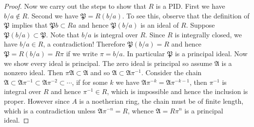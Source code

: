 \begin{proof}
Now we carry out the steps to show that $R$ is a PID. First we have $b/a\notin R$. Second we have $\mathfrak{P}=R(b/a)$. To see this, observe that the definition of $\mathfrak{P}$ implies that $\mathfrak{P}b\subset Ra$ and hence $\mathfrak{P}(b/a)$ is an ideal of $R$. Suppose $\mathfrak{P}(b/a)\subset\mathfrak{P}$. Note that $b/a$ is integral over $R$. Since $R$ is integrally closed, we have $b/a\in R$, a contradiction! Therefore $\mathfrak{P}(b/a)=R$ and hence $\mathfrak{P}=R(b/a)=R\pi$ if we write $\pi=b/a$. In particular $\mathfrak{P}$ is a principal ideal. Now we show every ideal is principal. The zero ideal is principal so assume $\mathfrak{A}$ is a nonzero ideal. Then $\pi\mathfrak{A}\subset\mathfrak{A}$ and so $\mathfrak{A}\subset\mathfrak{A}\pi^{-1}$. Consider the chain $\mathfrak{A}\subset\mathfrak{A}\pi^{-1}\subset\mathfrak{A}\pi^{-2}\subset\cdots$, if for some $k$ we have $\mathfrak{A}\pi^{-k}=\mathfrak{A}\pi^{-k-1}$, then $\pi^{-1}$ is integral over $R$ and hence $\pi^{-1}\in R$, which is impossible and hence the inclusion is proper. However since $A$ is a noetherian ring, the chain must be of finite length, which is a contradiction unless $\mathfrak{A}\pi^{-n}=R$, whence $\mathfrak{A}=R\pi^n$ is a principal ideal.
\end{proof}
